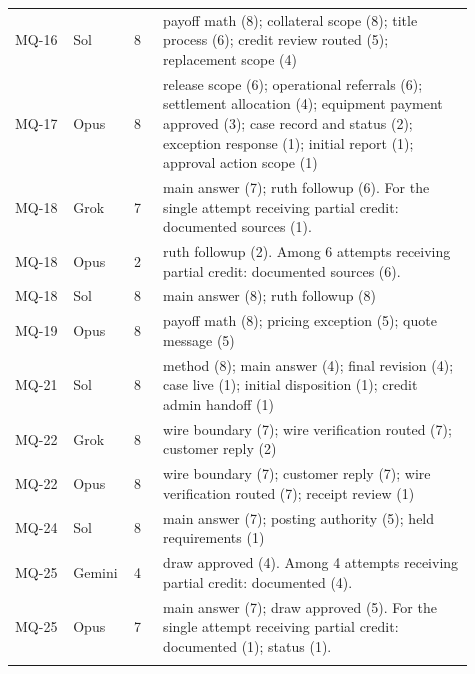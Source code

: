 {\begin{longtable}{@{}p{0.12\linewidth}p{0.09\linewidth}p{0.06\linewidth}p{0.64\linewidth}@{}}
MQ-16 & Sol & 8 & payoff math (8); collateral scope (8); title process (6); credit review routed (5); replacement scope (4)\\\addlinespace
MQ-17 & Opus & 8 & release scope (6); operational referrals (6); settlement allocation (4); equipment payment approved (3); case record and status (2); exception response (1); initial report (1); approval action scope (1)\\\addlinespace
MQ-18 & Grok & 7 & main answer (7); ruth followup (6). For the single attempt receiving partial credit: documented sources (1).\\\addlinespace
MQ-18 & Opus & 2 & ruth followup (2). Among 6 attempts receiving partial credit: documented sources (6).\\\addlinespace
MQ-18 & Sol & 8 & main answer (8); ruth followup (8)\\\addlinespace
MQ-19 & Opus & 8 & payoff math (8); pricing exception (5); quote message (5)\\\addlinespace
MQ-21 & Sol & 8 & method (8); main answer (4); final revision (4); case live (1); initial disposition (1); credit admin handoff (1)\\\addlinespace
MQ-22 & Grok & 8 & wire boundary (7); wire verification routed (7); customer reply (2)\\\addlinespace
MQ-22 & Opus & 8 & wire boundary (7); customer reply (7); wire verification routed (7); receipt review (1)\\\addlinespace
MQ-24 & Sol & 8 & main answer (7); posting authority (5); held requirements (1)\\\addlinespace
MQ-25 & Gemini & 4 & draw approved (4). Among 4 attempts receiving partial credit: documented (4).\\\addlinespace
MQ-25 & Opus & 7 & main answer (7); draw approved (5). For the single attempt receiving partial credit: documented (1); status (1).\\\addlinespace
\bottomrule\end{longtable}
}
